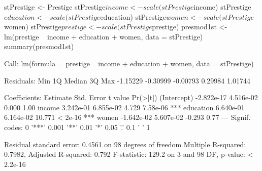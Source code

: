 \begin{Schunk}
\begin{Sinput}
 stPrestige <- Prestige
 stPrestige$income <- scale(stPrestige$income)
 stPrestige$education <- scale(stPrestige$education) 
 stPrestige$women <- scale(stPrestige$women)  
 stPrestige$prestige <- scale(stPrestige$prestige)
 presmod1st <- lm(prestige ~ income + education + women, data = stPrestige)
 summary(presmod1st)
\end{Sinput}
\begin{Soutput}
Call:
lm(formula = prestige ~ income + education + women, data = stPrestige)

Residuals:
     Min       1Q   Median       3Q      Max 
-1.15229 -0.30999 -0.00793  0.29984  1.01744 

Coefficients:
              Estimate Std. Error t value Pr(>|t|)    
(Intercept) -2.822e-17  4.516e-02   0.000     1.00    
income       3.242e-01  6.855e-02   4.729 7.58e-06 ***
education    6.640e-01  6.164e-02  10.771  < 2e-16 ***
women       -1.642e-02  5.607e-02  -0.293     0.77    
---
Signif. codes:  0 '***' 0.001 '**' 0.01 '*' 0.05 '.' 0.1 ' ' 1

Residual standard error: 0.4561 on 98 degrees of freedom
Multiple R-squared:  0.7982,	Adjusted R-squared:  0.792 
F-statistic: 129.2 on 3 and 98 DF,  p-value: < 2.2e-16
\end{Soutput}
\end{Schunk}
